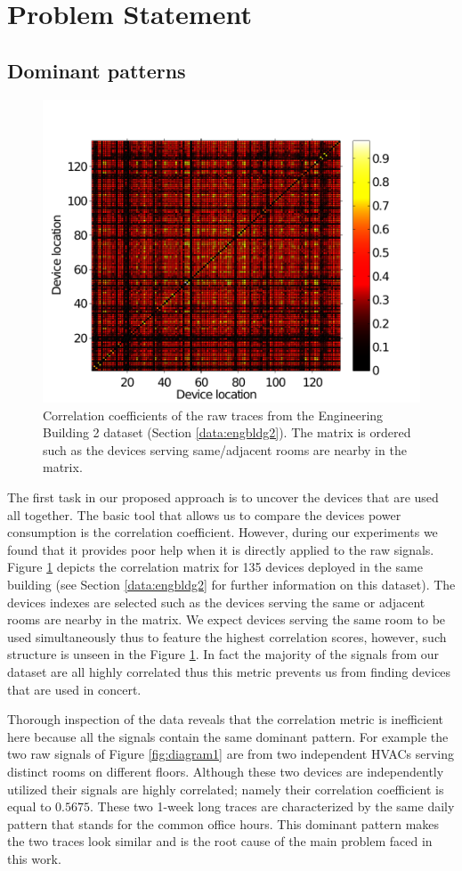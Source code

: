 \section{Problem Statement}
\subsection{Dominant patterns}
\begin{figure}
\includegraphics[width=.48\textwidth]{img/heatMap_raw_201106-eps-converted-to.pdf}
\caption{Correlation coefficients of the raw traces from the Engineering Building 2 dataset (Section \ref{data:engbldg2}).
The matrix is ordered such as the devices serving same/adjacent rooms are nearby in the matrix.}
\label{fig:heatmap:raw}
\end{figure}

The first task in our proposed approach is to uncover the devices that are used all together.
The basic tool that allows us to compare the devices power consumption is the correlation coefficient.
However, during our experiments we found that it provides poor help when it is directly applied to the raw signals.
Figure \ref{fig:heatmap:raw} depicts the correlation matrix for 135 devices deployed in the same building (see Section \ref{data:engbldg2} for further information on this dataset).
The devices indexes are selected such as the devices serving the same or adjacent rooms are nearby in the matrix.
We expect devices serving the same room to be used simultaneously thus to feature the highest correlation scores, however, such structure is unseen in the Figure \ref{fig:heatmap:raw}.
In fact the majority of the signals from our dataset are all highly correlated thus this metric prevents us from finding devices that are used in concert.

Thorough inspection of the data reveals that the correlation metric is inefficient here because all the signals contain the same dominant pattern.
For example the two raw signals of Figure \ref{fig:diagram1} are from two independent HVACs serving distinct rooms on different floors.
Although these two devices are independently utilized their signals are highly correlated; namely their correlation coefficient is equal to $0.5675$.
These two 1-week long traces are characterized by the same daily pattern that stands for the common office hours.
This dominant pattern makes the two traces look similar and is the root cause of the main problem faced in this work.

